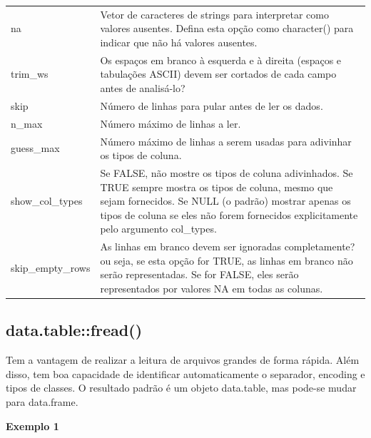 \documentclass[
]{book}
\theoremstyle{definition}
\theoremstyle{definition}
\theoremstyle{definition}
\theoremstyle{definition}
\theoremstyle{remark}
\begin{document}
\begin{longtable}[]{@{}
  >{\raggedright\arraybackslash}p{}
  >{\raggedright\arraybackslash}p{}@{}}
na & Vetor de caracteres de strings para interpretar como valores ausentes. Defina esta opção como character() para indicar que não há valores ausentes. \\
trim\_ws & Os espaços em branco à esquerda e à direita (espaços e tabulações ASCII) devem ser cortados de cada campo antes de analisá-lo? \\
skip & Número de linhas para pular antes de ler os dados. \\
n\_max & Número máximo de linhas a ler. \\
guess\_max & Número máximo de linhas a serem usadas para adivinhar os tipos de coluna. \\
show\_col\_types & Se FALSE, não mostre os tipos de coluna adivinhados. Se TRUE sempre mostra os tipos de coluna, mesmo que sejam fornecidos. Se NULL (o padrão) mostrar apenas os tipos de coluna se eles não forem fornecidos explicitamente pelo argumento col\_types. \\
skip\_empty\_rows & As linhas em branco devem ser ignoradas completamente? ou seja, se esta opção for TRUE, as linhas em branco não serão representadas. Se for FALSE, eles serão representados por valores NA em todas as colunas. \\
\bottomrule
\end{longtable}

\hypertarget{data.tablefread}{%
\subsection{data.table::fread()}\label{data.tablefread}}

Tem a vantagem de realizar a leitura de arquivos grandes de forma rápida. Além disso, tem boa capacidade de identificar automaticamente o separador, encoding e tipos de classes. O resultado padrão é um objeto data.table, mas pode-se mudar para data.frame.

\textbf{Exemplo 1}
\end{document}
